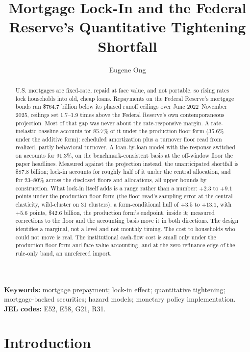 \documentclass[12pt]{article}
\title{Mortgage Lock-In and the Federal Reserve's Quantitative Tightening Shortfall}
\author{Eugene Ong}
\affil{Carnegie Mellon University}
\date{}
\begin{document}
\maketitle
\begin{abstract}
\noindent U.S. mortgages are fixed-rate, repaid at face value, and not portable, so rising rates lock households into old, cheap loans. Repayments on the Federal Reserve's mortgage bonds ran \$764.7 billion below its phased runoff ceilings over June 2022--November 2025, ceilings set 1.7--1.9 times above the Federal Reserve's own contemporaneous projection. Most of that gap was never about the rate-responsive margin. A rate-inelastic baseline accounts for 85.7\% of it under the production floor form (35.6\% under the additive form): scheduled amortization plus a turnover floor read from realized, partly behavioral turnover. A loan-by-loan model with the response switched on accounts for 91.3\%, on the benchmark-consistent basis at the off-window floor the paper headlines. Measured against the projection instead, the unanticipated shortfall is \$87.8 billion; lock-in accounts for roughly half of it under the central allocation, and for 23--80\% across the disclosed floors and allocations, all upper bounds by construction. What lock-in itself adds is a range rather than a number: $+2.3$ to $+9.1$ points under the production floor form (the floor read's sampling error at the central elasticity, wild-cluster on 31 clusters), a form-conditional hull of $+3.5$ to $+13.1$, with $+5.6$ points, \$42.6 billion, the production form's endpoint, inside it; measured corrections to the floor and the accounting basis move it in both directions. The design identifies a marginal, not a level and not monthly timing. The cost to households who could not move is real. The institutional cash-flow cost is small only under the production floor form and face-value accounting, and at the zero-refinance edge of the rule-only band, an unrefereed import.
\end{abstract}

\vspace{0.5\baselineskip}
{\footnotesize\noindent\textbf{Keywords:} mortgage prepayment; lock-in effect; quantitative tightening; mortgage-backed securities; hazard models; monetary policy implementation.\\
\textbf{JEL codes:} E52, E58, G21, R31.\par}
\newpage
\section{Introduction}\label{sec:intro}
\end{document}
